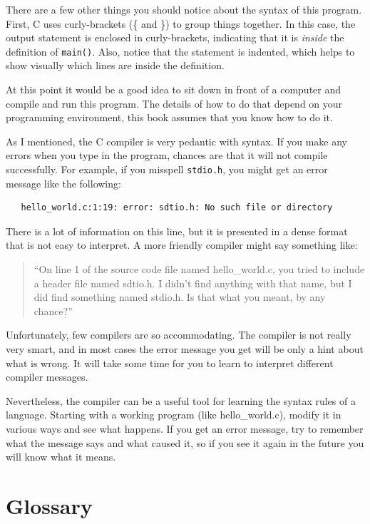 There are a few other things you should notice about the syntax
of this program.  First, C uses curly-brackets (\{ and
\}) to group things together. 
In this case, the output statement
is enclosed in curly-brackets, indicating that it is {\em inside} the
definition of {\tt main()}.  Also, notice that the statement is
indented, which helps to show visually which lines are inside the
definition.

At this point it would be a good idea to sit down in front of
a computer and compile and run this program.  The details of how
to do that depend on your programming environment, this book 
assumes that you know how to do it.

As I mentioned, the C compiler is very pedantic with syntax.
If you make any errors when you type in the program, chances
are that it will not compile successfully.  For example, if
you misspell {\tt stdio.h}, you might get an error message like
the following:

\begin{verbatim}
   hello_world.c:1:19: error: sdtio.h: No such file or directory
\end{verbatim}
%
There is a lot of information on this line, but it is presented
in a dense format that is not easy to interpret.  A more friendly
compiler might say something like:

\begin{quote}
``On line 1 of the source code file named hello\_world.c, you tried to
include a header file named sdtio.h.  I didn't find anything
with that name, but I did find something named stdio.h.  Is
that what you meant, by any chance?''
\end{quote}

Unfortunately, few compilers are so accommodating.  The compiler
is not really very smart, and in most cases the error message
you get will be only a hint about what is wrong.  It will take
some time for you to learn to interpret different compiler messages.

Nevertheless, the compiler can be a useful tool for learning the
syntax rules of a language.  Starting with a working program
(like hello\_world.c), modify it in various ways and see what happens.
If you get an error message, try to remember what the message says
and what caused it, so if you see it again in the future you
will know what it means.





\section{Glossary}


